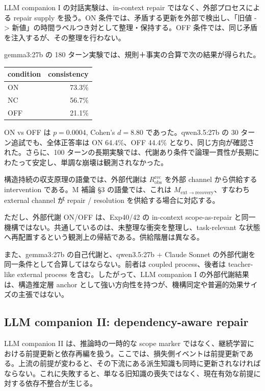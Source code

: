 \documentclass[12pt,a4paper]{article}
\begin{document}
LLM companion I の対話実験は、in-context repair ではなく、外部プロセスによる repair supply を扱う。ON 条件では、矛盾する更新を外部で検出し、「旧値 -\textgreater{} 新値」の時間ラベルつき対として整理・保持する。OFF 条件では、同じ矛盾を注入するが、その整理を行わない。

gemma3:27b の 180 ターン実験では、規則＋事実の合算で次の結果が得られた。

{\def\LTcaptype{table} %
\begin{longtable}[]{@{}lr@{}}
\toprule\noalign{}
condition & consistency \\
\midrule\noalign{}
\endhead
\bottomrule\noalign{}
\endlastfoot
ON & 73.3\% \\
NC & 56.7\% \\
OFF & 21.1\% \\
\end{longtable}
}

ON vs OFF は \(p=0.0004\), Cohen's \(d=8.80\) であった。qwen3.5:27b の 30 ターン追試でも、全体正答率は ON 64.4\%、OFF 44.4\% となり、同じ方向が確認された。さらに、100 ターンの長期実験では、代謝あり条件で論理一貫性が長期にわたって安定し、単調な崩壊は観測されなかった。

構造持続の収支原理の語彙では、外部代謝は \(R_{\mathrm{obs}}^{\mathrm{rec}}\) を外部 channel から供給する intervention である。M 補論 §3 の語彙では、これは \(M_{\mathrm{ext}\to\mathrm{recovery}}\)、すなわち external channel が repair / resolution を供給する場合に対応する。

ただし、外部代謝 ON/OFF は、Exp40/42 の in-context scope-as-repair と同一機構ではない。共通しているのは、未整理な衝突を整理し、task-relevant な状態へ再配置するという観測上の帰結である。供給階層は異なる。

また、gemma3:27b の自己代謝と、qwen3.5:27b + Claude Sonnet の外部代謝を同一条件として合算してはならない。前者は coupled process、後者は teacher-like external process を含む。したがって、LLM companion I の外部代謝結果は、構造推定層 anchor として強い方向性を持つが、機構同定や普遍的効果サイズの主張ではない。

\subsection{LLM companion II: dependency-aware repair}\label{llm-companion-ii-dependency-aware-repair}

LLM companion II は、推論時の一時的な scope marker ではなく、継続学習における前提更新と依存再編を扱う。ここでは、損失側イベントは前提更新である。上流の前提が変わると、その下流にある派生知識も同時に更新されなければならない。これに失敗すると、単なる旧知識の喪失ではなく、現在有効な前提に対する依存不整合が生じる。
\end{document}
